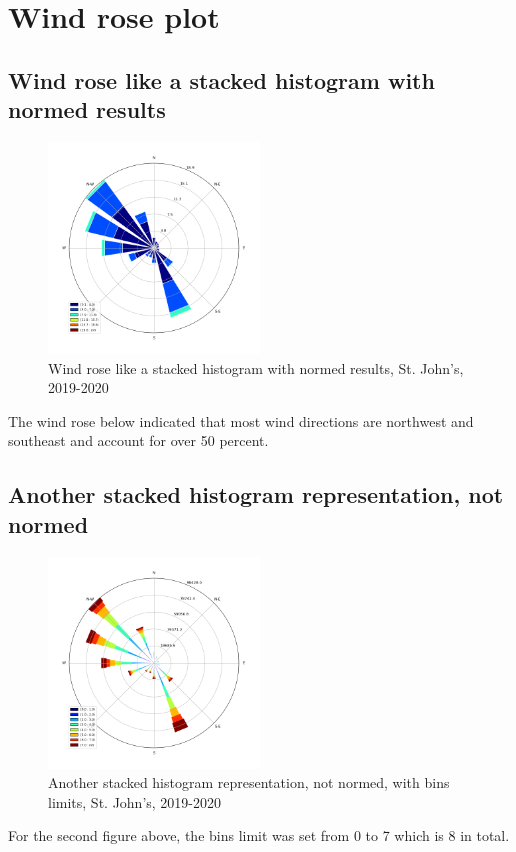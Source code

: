 \documentclass[10pt]{report}
\begin{document}
\section{Wind rose plot}
 \subsection{Wind rose like a stacked histogram with normed results}
 \begin{figure}[h!]
    \centering
    \includegraphics[width=0.50\textwidth]{images/figure2.png}
    \caption{Wind rose like a stacked histogram with normed results, St. John's, 2019-2020}
    \label{fig: PaleBlueDot}    
\end{figure}
The wind rose below indicated that most wind directions are northwest and southeast and account for over 50 percent.

 \subsection{Another stacked histogram representation, not normed}
 \begin{figure}[h!]
    \centering
    \includegraphics[width=0.50\textwidth]{images/figure3.png}
    \caption{Another stacked histogram representation, not normed, with bins limits, St. John's, 2019-2020}
    \label{fig: PaleBlueDot}    
\end{figure}
For the second figure above, the bins limit was set from 0 to 7 which is 8 in total.
\end{document}
